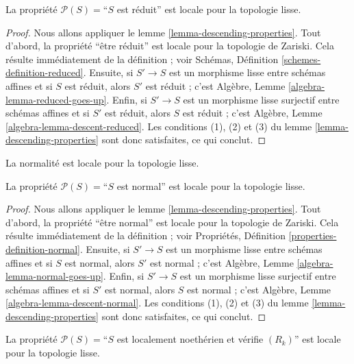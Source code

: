 \begin{lemma}
\label{lemma-reduced-local-smooth}
La propriété $\mathcal{P}(S) =$``$S$ est réduit'' est locale pour la topologie
lisse.
\end{lemma}

\begin{proof}
Nous allons appliquer le lemme \ref{lemma-descending-properties}.
Tout d'abord, la propriété ``être réduit'' est locale pour la topologie de
Zariski. Cela résulte immédiatement de la définition ; voir Schémas,
Définition \ref{schemes-definition-reduced}. Ensuite, si $S' \to S$ est un
morphisme lisse entre schémas affines et si $S$ est réduit, alors $S'$ est
réduit ; c'est Algèbre, Lemme \ref{algebra-lemma-reduced-goes-up}.
Enfin, si $S' \to S$ est un morphisme lisse surjectif entre schémas affines
et si $S'$ est réduit, alors $S$ est réduit ; c'est Algèbre, Lemme
\ref{algebra-lemma-descent-reduced}. Les conditions (1), (2) et (3) du
lemme \ref{lemma-descending-properties} sont donc satisfaites, ce qui conclut.
\end{proof}

\begin{lemma}
\label{lemma-normal-local-smooth}
\begin{slogan}
La normalité est locale pour la topologie lisse.
\end{slogan}
La propriété $\mathcal{P}(S) =$``$S$ est normal'' est locale pour la topologie
lisse.
\end{lemma}

\begin{proof}
Nous allons appliquer le lemme \ref{lemma-descending-properties}.
Tout d'abord, la propriété ``être normal'' est locale pour la topologie de
Zariski. Cela résulte immédiatement de la définition ; voir Propriétés,
Définition \ref{properties-definition-normal}. Ensuite, si $S' \to S$ est
un morphisme lisse entre schémas affines et si $S$ est normal, alors $S'$ est
normal ; c'est Algèbre, Lemme \ref{algebra-lemma-normal-goes-up}. Enfin, si
$S' \to S$ est un morphisme lisse surjectif entre schémas affines et si $S'$
est normal, alors $S$ est normal ; c'est Algèbre, Lemme
\ref{algebra-lemma-descent-normal}. Les conditions (1), (2) et (3) du
lemme \ref{lemma-descending-properties} sont donc satisfaites, ce qui conclut.
\end{proof}

\begin{lemma}
\label{lemma-Rk-local-smooth}
La propriété $\mathcal{P}(S) =$``$S$ est localement noethérien et vérifie
$(R_k)$'' est locale pour la topologie lisse.
\end{lemma}

